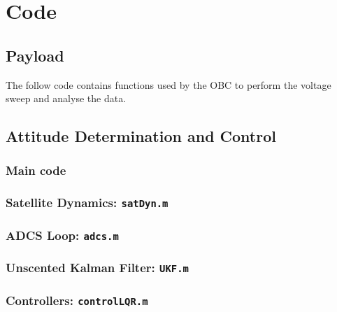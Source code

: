 \section{Code}
\subsection{Payload} \label{app:code_payload}
The follow code contains functions used by the OBC to perform the voltage sweep and analyse the data.



\subsection{Attitude Determination and Control \label{app:mat}}

\subsubsection{Main code}



\subsubsection{Satellite Dynamics: \texttt{satDyn.m}}



\subsubsection{ADCS Loop: \texttt{adcs.m}}



\subsubsection{Unscented Kalman Filter: \texttt{UKF.m}}



\subsubsection{Controllers: \texttt{controlLQR.m}}



